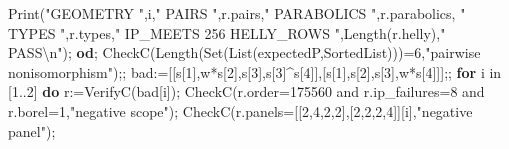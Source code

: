 \documentclass[
  10pt,
  letterpaper,
]{article}
\newenvironment{Shaded}{}{}
\newcommand{\BuiltInTok}[1]{\textcolor[rgb]{0.00,0.50,0.00}{#1}}
\newcommand{\ConstantTok}[1]{\textcolor[rgb]{0.53,0.00,0.00}{#1}}
\newcommand{\ControlFlowTok}[1]{\textcolor[rgb]{0.00,0.44,0.13}{\textbf{#1}}}
\newcommand{\ExtensionTok}[1]{#1}
\newcommand{\FloatTok}[1]{\textcolor[rgb]{0.25,0.63,0.44}{#1}}
\newcommand{\NormalTok}[1]{#1}
\newcommand{\OperatorTok}[1]{\textcolor[rgb]{0.40,0.40,0.40}{#1}}
\newcommand{\StringTok}[1]{\textcolor[rgb]{0.25,0.44,0.63}{#1}}
\newcommand{\VariableTok}[1]{\textcolor[rgb]{0.10,0.09,0.49}{#1}}
\begin{document}
\begin{Shaded}
\begin{Highlighting}[]
 \BuiltInTok{Print}\NormalTok{(}\StringTok{"GEOMETRY "}\OperatorTok{,}\VariableTok{i}\OperatorTok{,}\StringTok{" PAIRS "}\OperatorTok{,}\VariableTok{r}\NormalTok{.}\VariableTok{pairs}\OperatorTok{,}\StringTok{" PARABOLICS "}\OperatorTok{,}\VariableTok{r}\NormalTok{.}\VariableTok{parabolics}\OperatorTok{,}
  \StringTok{" TYPES "}\OperatorTok{,}\VariableTok{r}\NormalTok{.}\VariableTok{types}\OperatorTok{,}\StringTok{" IP\_MEETS 256 HELLY\_ROWS "}\OperatorTok{,}\BuiltInTok{Length}\NormalTok{(}\VariableTok{r}\NormalTok{.}\VariableTok{helly}\NormalTok{)}\OperatorTok{,}\StringTok{" PASS\textbackslash{}n"}\NormalTok{)}\OperatorTok{;}
\ControlFlowTok{od}\OperatorTok{;}
\VariableTok{CheckC}\NormalTok{(}\BuiltInTok{Length}\NormalTok{(}\BuiltInTok{Set}\NormalTok{(}\BuiltInTok{List}\NormalTok{(}\VariableTok{expectedP}\OperatorTok{,}\BuiltInTok{SortedList}\NormalTok{)))}\OperatorTok{=}\FloatTok{6}\OperatorTok{,}\StringTok{"pairwise nonisomorphism"}\NormalTok{)}\OperatorTok{;;}
\VariableTok{bad}\OperatorTok{:=}\NormalTok{[[}\VariableTok{s}\NormalTok{[}\FloatTok{1}\NormalTok{]}\OperatorTok{,}\VariableTok{w}\OperatorTok{*}\VariableTok{s}\NormalTok{[}\FloatTok{2}\NormalTok{]}\OperatorTok{,}\VariableTok{s}\NormalTok{[}\FloatTok{3}\NormalTok{]}\OperatorTok{,}\VariableTok{s}\NormalTok{[}\FloatTok{3}\NormalTok{]}\OperatorTok{\^{}}\VariableTok{s}\NormalTok{[}\FloatTok{4}\NormalTok{]]}\OperatorTok{,}\NormalTok{[}\VariableTok{s}\NormalTok{[}\FloatTok{1}\NormalTok{]}\OperatorTok{,}\VariableTok{s}\NormalTok{[}\FloatTok{2}\NormalTok{]}\OperatorTok{,}\VariableTok{s}\NormalTok{[}\FloatTok{3}\NormalTok{]}\OperatorTok{,}\VariableTok{w}\OperatorTok{*}\VariableTok{s}\NormalTok{[}\FloatTok{4}\NormalTok{]]]}\OperatorTok{;;}
\ControlFlowTok{for} \VariableTok{i} \ExtensionTok{in}\NormalTok{ [}\FloatTok{1}\OperatorTok{..}\FloatTok{2}\NormalTok{] }\ControlFlowTok{do}
 \VariableTok{r}\OperatorTok{:=}\VariableTok{VerifyC}\NormalTok{(}\VariableTok{bad}\NormalTok{[}\VariableTok{i}\NormalTok{])}\OperatorTok{;}
 \VariableTok{CheckC}\NormalTok{(}\VariableTok{r}\NormalTok{.}\VariableTok{order}\OperatorTok{=}\FloatTok{175560} \ConstantTok{and} \VariableTok{r}\NormalTok{.}\VariableTok{ip\_failures}\OperatorTok{=}\FloatTok{8} \ConstantTok{and} \VariableTok{r}\NormalTok{.}\VariableTok{borel}\OperatorTok{=}\FloatTok{1}\OperatorTok{,}\StringTok{"negative scope"}\NormalTok{)}\OperatorTok{;}
 \VariableTok{CheckC}\NormalTok{(}\VariableTok{r}\NormalTok{.}\VariableTok{panels}\OperatorTok{=}\NormalTok{[[}\FloatTok{2}\OperatorTok{,}\FloatTok{4}\OperatorTok{,}\FloatTok{2}\OperatorTok{,}\FloatTok{2}\NormalTok{]}\OperatorTok{,}\NormalTok{[}\FloatTok{2}\OperatorTok{,}\FloatTok{2}\OperatorTok{,}\FloatTok{2}\OperatorTok{,}\FloatTok{4}\NormalTok{]][}\VariableTok{i}\NormalTok{]}\OperatorTok{,}\StringTok{"negative panel"}\NormalTok{)}\OperatorTok{;}

\end{Highlighting}
\end{Shaded}
\end{document}
